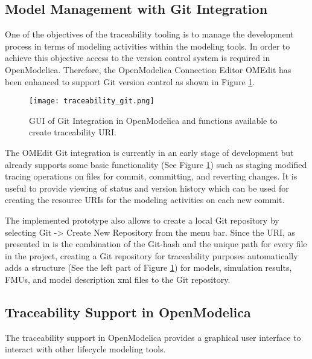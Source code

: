 \subsection{Model Management with Git Integration}
\label{sec:tracaebilitygit}

One of the objectives of the traceability tooling is to manage the development process in terms of modeling
activities within the modeling tools. In order to achieve this objective access to the version control system is
required in OpenModelica. Therefore, the OpenModelica Connection Editor OMEdit has been enhanced to support Git version 
control as shown in Figure \ref{fig:traceabilitygit}.

\begin{figure}
	\texttt{[image: traceability\_git.png]}
	\caption{GUI of Git Integration in OpenModelica and functions available to create traceability URI.}
	\label{fig:traceabilitygit}
\end{figure}

The OMEdit Git integration is currently in an early stage of development but already supports some basic
functionality (See Figure \ref{fig:traceabilitygit}) such as staging modified tracing operations on files 
for commit, committing, and reverting changes. It is useful to provide viewing of status and version history 
which can be used for creating the resource URIs for the modeling activities on each new commit.

The implemented prototype also allows to create a local Git repository by selecting Git -> Create New Repository from the menu bar. 
Since the URI, as presented in \cite{intocpsjohn} is the combination of the Git-hash and the unique path for every file in the
project, creating a Git repository for traceability purposes automatically adds a structure (See the left
part of Figure \ref{fig:traceabilitygit}) for models, simulation results, FMUs, and model description \acrshort{xml} files to the Git repository.

\subsection{Traceability Support in OpenModelica}
\label{subsec:traceabilityopenmodelica}

The traceability support in OpenModelica provides a graphical user interface to interact with other lifecycle
modeling tools.

